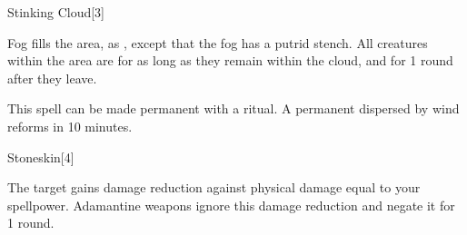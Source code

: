\begin{spellsection}{Stinking Cloud}[3]
    \begin{spellheader}
    \end{spellheader}
    \begin{spellcontent}
        \begin{spelltargetinginfo}
        \end{spelltargetinginfo}
        \begin{spelleffects}
            \spelleffect Fog fills the area, as , except that the fog has a putrid stench. All creatures within the area are \sickened for as long as they remain within the cloud, and for 1 round after they leave.
            \spelldur \durshort
        \end{spelleffects}
    \end{spellcontent}
    \begin{spellfooter}
        \spellnotes This spell can be made permanent with a  ritual. A permanent  dispersed by wind reforms in 10 minutes. \fogspellnotes \fogwindspellnotes

        \physicalspellnotes
        \miscastyou
    \end{spellfooter}
\end{spellsection}

\begin{spellsection}{Stoneskin}[4]
    \begin{spellheader}
    \end{spellheader}
    \begin{spellcontent}
        \begin{spelltargetinginfo}
        \end{spelltargetinginfo}
        \begin{spelleffects}
            \spelleffect The target gains damage reduction against physical damage equal to your spellpower. Adamantine weapons ignore this damage reduction and negate it for 1 round.
            \spelldur \durpersonallong
        \end{spelleffects}
    \end{spellcontent}
    \begin{spellfooter}
        \miscastexplode
    \end{spellfooter}
\end{spellsection}

